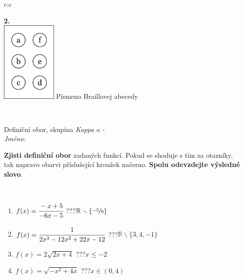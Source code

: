 \documentclass[10pt]{report}
\begin{document}
\begin{tabular}{c:c}
\begin{minipage}[c][104.5mm][t]{0.5\linewidth}
\begin{center}
\begin{minipage}{0.20\linewidth}
\begin{center}
{\Huge\bfseries 2.} \\[2mm]
\includegraphics[height=40mm]{../images/braille.png}
{\small Písmeno Braillovej abecedy}
\end{center}
\end{minipage}
\end{center}
\end{minipage}
\\ \hdashline
\begin{minipage}[c][104.5mm][t]{0.5\linewidth}
\begin{center}
\vspace{7mm}
{\huge Definiční obor, skupina \textit{Kappa $\kappa$} -}\\[5mm]
\textit{Jméno:}\phantom{xxxxxxxxxxxxxxxxxxxxxxxxxxxxxxxxxxxxxxxxxxxxxxxxxxxxxxxxxxxxxxxxx}\\[5mm]
\begin{minipage}{0.95\linewidth}
\begin{center}
\textbf{Zjisti definiční obor} zadaných funkcí. Pokud se shoduje s tím za otazníky,\\tak napravo obarvi příslušející kroužek načerno. \textbf{Spolu odevzdejte výsledné slovo}.
\end{center}
\end{minipage}
\\[1mm]
\begin{minipage}{0.79\linewidth}
\begin{center}
\begin{varwidth}{\linewidth}
\begin{enumerate}
\normalsizerrr
\item $f(x)=\cfrac{-x+5}{-6x-5}$\quad \dotfill\; ???\;\dotfill \quad $\mathbb{R}\smallsetminus\{\nicefrac{-5}{6}\}$
\item $f(x)=\cfrac{1}{2x^3-12x^2+22x-12}$\quad \dotfill\; ???\;\dotfill \quad $\mathbb{R}\smallsetminus\{3,4,-1\}$
\item $f(x)=2\sqrt{2x+4}$\quad \dotfill\; ???\;\dotfill \quad $x\leq-2$
\item $f(x)=\sqrt{-x^2+4x}$\quad \dotfill\; ???\;\dotfill \quad $x\in(0 , 4)$

\end{enumerate}
\end{varwidth}
\end{center}
\end{minipage}
\end{center}
\end{minipage}
\end{tabular}
\end{document}
